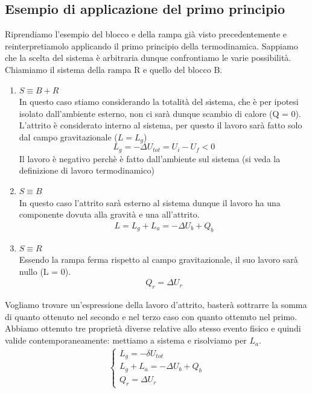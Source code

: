 \documentclass[10pt,a4paper]{article}
\begin{document}
\subsection{Esempio di applicazione del primo principio}
Riprendiamo l'esempio del blocco e della rampa già visto precedentemente e reinterpretiamolo applicando il primo principio della termodinamica. Sappiamo che la scelta del sistema è arbitraria dunque confrontiamo le varie possibilità. Chiamiamo il sistema della rampa R e quello del blocco B.
\begin{enumerate}
\item $S \equiv B + R$\\
In questo caso stiamo considerando la totalità del sistema, che è per ipotesi isolato dall'ambiente esterno, non ci sarà dunque scambio di calore (Q = 0). L'attrito è considerato interno al sistema, per questo il lavoro sarà fatto solo dal campo gravitazionale ($L = L_g$)
\begin{equation}
	L_g = -\Delta U_{tot} = U_i-U_f < 0
\end{equation} 
Il lavoro è negativo perchè è fatto dall'ambiente sul sistema (si veda la definizione di lavoro termodinamico)
\item $S\equiv B$\\
In questo caso l'attrito sarà esterno al sistema dunque il lavoro ha una componente dovuta alla gravità e una all'attrito. 
\begin{align*} 
	L = L_g + L_a = - \Delta U_b + Q_b
\end{align*} 
\item $S\equiv R$\\
Essendo la rampa ferma rispetto al campo gravitazionale, il suo lavoro sarà nullo (L = 0).
\begin{align*} 
	Q_r = \Delta U_r
\end{align*}  
\end{enumerate}
Vogliamo trovare un'espressione della lavoro d'attrito, basterà sottrarre la somma di quanto ottenuto nel secondo e nel terzo caso con quanto ottenuto nel primo. Abbiamo ottenuto tre proprietà diverse relative allo stesso evento fisico e quindi valide contemporaneamente: mettiamo a sistema e risolviamo per $L_a$.
\begin{align*} 
\begin{cases}
		L_g =  -\delta U_{tot} \\
		L_g + L_a = - \Delta U_b + Q_b\\
		Q_r = \Delta U_r
\end{cases}
\end{align*} 
\end{document}
